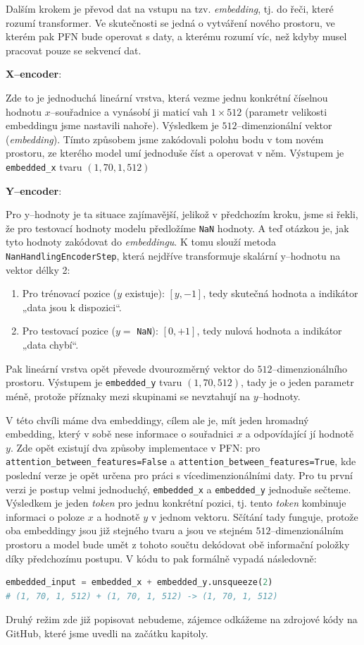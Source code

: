 Dalším krokem je převod dat na vstupu na tzv. \textit{embedding}, tj. do řeči, které rozumí transformer. 
Ve skutečnosti se jedná o vytváření nového prostoru, ve kterém pak PFN bude operovat s daty, a kterému rozumí víc, než kdyby musel pracovat pouze se sekvencí dat.


\textbf{X–encoder}:

Zde to je jednoduchá lineární vrstva, která vezme jednu konkrétní číselnou hodnotu $x$–souřadnice a vynásobí ji maticí vah $1\times512$ (parametr velikosti embeddingu jsme nastavili nahoře).
Výsledkem je $512$–dimenzionální vektor (\textit{embedding}).
Tímto způsobem jsme zakódovali polohu bodu v tom novém prostoru, ze kterého model umí jednoduše číst a operovat v něm.
Výstupem je \texttt{embedded\_x} tvaru $(1, 70, 1, 512)$

\textbf{Y–encoder}:

Pro y–hodnoty je ta situace zajímavější, jelikož v předchozím kroku, jsme si řekli, že pro testovací hodnoty modelu předložíme \texttt{NaN} hodnoty. 
A teď otázkou je, jak tyto hodnoty zakódovat do \textit{embeddingu}.
K tomu slouží metoda \lstinline|NanHandlingEncoderStep|, která nejdříve transformuje skalární y–hodnotu na vektor délky 2:

\begin{enumerate}
    \item Pro trénovací pozice ($y$ existuje): $[y, -1]$, tedy skutečná hodnota a indikátor „data jsou k dispozici“.
    \item Pro testovací pozice ($y =$ \texttt{NaN}): $[0, +1]$, tedy nulová hodnota a indikátor „data chybí“. 
\end{enumerate}

Pak lineární vrstva opět převede dvourozměrný vektor do $512$–dimenzionálního prostoru.
Výstupem je \texttt{embedded\_y} tvaru $(1, 70, 512)$, tady je o jeden parametr méně, protože příznaky mezi skupinami se nevztahují na $y$–hodnoty.
\par   

V této chvíli máme dva embeddingy, cílem ale je, mít jeden hromadný embedding, který v sobě nese informace o souřadnici $x$ a odpovídající jí hodnotě $y$.
Zde opět existují dva způsoby implementace v PFN: pro \lstinline|attention_between_features=False| a \lstinline|attention_between_features=True|, kde poslední verze je opět určena pro práci s vícedimenzionálními daty. 
Pro tu první verzi je postup velmi jednoduchý, \texttt{embedded\_x} a \texttt{embedded\_y} jednoduše sečteme. 
Výsledkem je jeden \emph{token} pro jednu konkrétní pozici, tj. tento \emph{token} kombinuje informaci o poloze $x$ a hodnotě $y$ v jednom vektoru.
Sčítání tady funguje, protože oba embeddingy jsou již stejného tvaru a jsou ve stejném $512$–dimenzionálním prostoru a model bude umět z tohoto součtu dekódovat obě informační položky díky předchozímu postupu.
V kódu to pak formálně vypadá následovně:
\begin{lstlisting}[language=Python]
embedded_input = embedded_x + embedded_y.unsqueeze(2)  
# (1, 70, 1, 512) + (1, 70, 1, 512) -> (1, 70, 1, 512)
\end{lstlisting}
Druhý režim zde již popisovat nebudeme, zájemce odkážeme na zdrojové kódy na GitHub, které jsme uvedli na začátku kapitoly.

